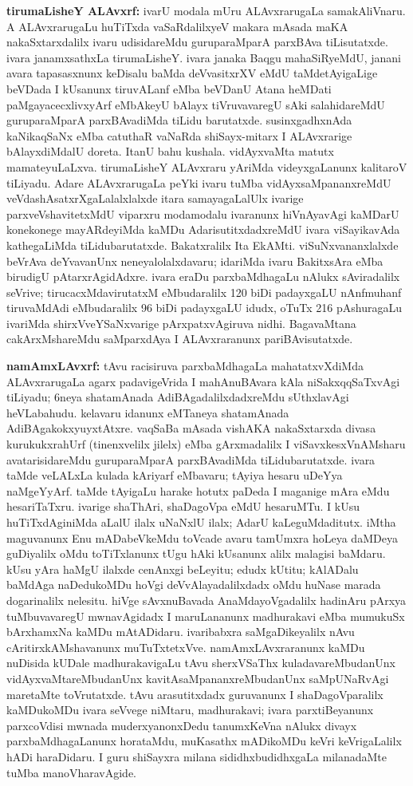 {\large\textbf{tirumaLisheY ALAvxrf:}} ivarU modala mUru ALAvxrarugaLa samakAliVnaru. A ALAvxrarugaLu huTiTxda vaSaRdalilxyeV makara mAsada maKA nakaSxtarxdalilx ivaru udisidareMdu guruparaMparA parxBAva tiLisutatxde. ivara janamxsathxLa tirumaLisheY. ivara janaka Baqgu mahaSiRyeMdU, janani avara tapasasxnunx keDisalu baMda deVvasitxrXV eMdU taMdetAyigaLige beVDada I kUsanunx tiruvALanf eMba beVDanU Atana heMDati paMgayacecxlivxyArf eMbAkeyU bAlayx tiVruvavaregU sAki salahidareMdU guruparaMparA parxBAvadiMda tiLidu barutatxde. susinxgadhxnAda kaNikaqSaNx eMba catuthaR vaNaRda shiSayx-mitarx I ALAvxrarige bAlayxdiMdalU doreta. ItanU bahu kushala. vidAyxvaMta matutx mamateyuLaLxva. tirumaLisheY ALAvxraru yAriMda videyxgaLanunx kalitaroV tiLiyadu. Adare ALAvxrarugaLa peYki ivaru tuMba vidAyxsaMpananxreMdU veVdashAsatxrXgaLalalxlalxde itara samayagaLalUlx ivarige parxveVshavitetxMdU viparxru modamodalu ivaranunx hiVnAyavAgi kaMDarU konekonege mayARdeyiMda kaMDu AdarisutitxdadxreMdU ivara viSayikavAda kathegaLiMda tiLidubarutatxde. Bakatxralilx Ita EkAMti. viSuNxvananxlalxde beVrAva deYvavanUnx neneyalolalxdavaru; idariMda ivaru BakitxsAra eMba birudigU pAtarxrAgidAdxre. ivara eraDu parxbaMdhagaLu nAlukx sAviradalilx seVrive; tirucacxMdavirutatxM eMbudaralilx 120 biDi padayxgaLU nAnfmuhanf tiruvaMdAdi eMbudaralilx 96 biDi padayxgaLU idudx, oTuTx 216 pAshuragaLu ivariMda shirxVveYSaNxvarige pArxpatxvAgiruva nidhi. BagavaMtana cakArxMshareMdu saMparxdAya I ALAvxraranunx pariBAvisutatxde.

{\large\textbf{namAmxLAvxrf:}} tAvu racisiruva parxbaMdhagaLa mahatatxvXdiMda ALAvxrarugaLa agarx padavi\-geVrida I mahAnuBAvara kAla niSakxqqSaTxvAgi tiLiyadu; 6neya shatamAnada Adi\-BAgadalilxdadxreMdu sUthxlavAgi heVLabahudu. kelavaru idanunx eMTaneya shatamAnada AdiBAgakokxyuyxtAtxre. vaqSaBa mAsada vishAKA nakaSxtarxda divasa kurukukxrahUrf (tinenxvelilx jilelx) eMba gArxmadalilx I viSavxkesxVnAMsharu avatarisidareMdu guru\-paraMparA parxBAvadiMda tiLidubarutatxde. ivara taMde veLALxLa kulada kAriyarf eMbavaru; tAyiya hesaru uDeYya naMgeYyArf. taMde tAyigaLu harake hotutx paDeda I maganige mAra eMdu hesariTaTxru. ivarige shaThAri, shaDagoVpa eMdU hesaruMTu. I kUsu huTiTxdAginiMda aLalU ilalx uNaNxlU ilalx; AdarU kaLeguMdaditutx. iMtha maguvanunx Enu mADabeVkeMdu toVcade avaru tamUmxra hoLeya daMDeya guDiyalilx oMdu toTiTxlanunx tUgu hAki kUsanunx alilx malagisi baMdaru. kUsu yAra haMgU ilalxde cenAnxgi beLeyitu; edudx kUtitu; kAlADalu baMdAga naDedukoMDu hoVgi deVvAlayadalilxdadx oMdu huNase marada dogarinalilx nelesitu. hiVge sAvxnuBavada AnaMdayoVgadalilx hadinAru pArxya tuMbuvavaregU mwnavAgidadx I maruLananunx madhurakavi eMba mumukuSx bArxhamxNa kaMDu mAtADidaru. ivaribabxra saMgaDikeyalilx nAvu cAritirxkAMshavanunx muTuTxtetxVve. namAmxLAvxraranunx kaMDu nuDisida kUDale madhurakavigaLu tAvu sherxVSaThx kuladavareMbudanUnx vidAyxvaMtareMbudanUnx kavitAsaMpananxreMbudanUnx saMpUNaRvAgi maretaMte toVrutatxde. tAvu arasutitxdadx guruvanunx I shaDagoVparalilx kaMDukoMDu ivara seVvege niMtaru, madhurakavi; ivara parxtiBeyanunx parxcoVdisi mwnada muderxyanonxDedu tanumxKeVna nAlukx divayx parxbaMdhagaLanunx horataMdu, muKasathx mADikoMDu keVri keVrigaLalilx hADi haraDidaru. I guru shiSayxra milana sididhxbudidhxgaLa milanadaMte tuMba manoVharavAgide.

